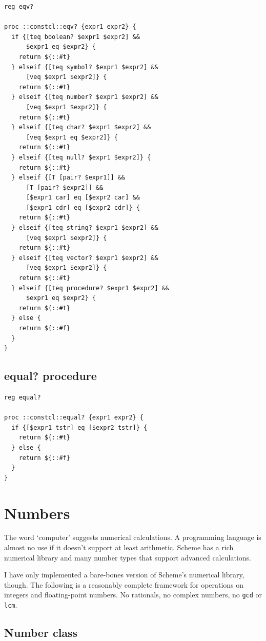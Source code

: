 \documentclass[a5paper,draft]{memoir}
\begin{document}
\begin{lstlisting}
reg eqv?

proc ::constcl::eqv? {expr1 expr2} {
  if {[teq boolean? $expr1 $expr2] &&
      $expr1 eq $expr2} {
    return ${::#t}
  } elseif {[teq symbol? $expr1 $expr2] &&
      [veq $expr1 $expr2]} {
    return ${::#t}
  } elseif {[teq number? $expr1 $expr2] &&
      [veq $expr1 $expr2]} {
    return ${::#t}
  } elseif {[teq char? $expr1 $expr2] &&
      [veq $expr1 eq $expr2]} {
    return ${::#t}
  } elseif {[teq null? $expr1 $expr2]} {
    return ${::#t}
  } elseif {[T [pair? $expr1]] &&
      [T [pair? $expr2]] &&
      [$expr1 car] eq [$expr2 car] &&
      [$expr1 cdr] eq [$expr2 cdr]} {
    return ${::#t}
  } elseif {[teq string? $expr1 $expr2] &&
      [veq $expr1 $expr2]} {
    return ${::#t}
  } elseif {[teq vector? $expr1 $expr2] &&
      [veq $expr1 $expr2]} {
    return ${::#t}
  } elseif {[teq procedure? $expr1 $expr2] &&
      $expr1 eq $expr2} {
    return ${::#t}
  } else {
    return ${::#f}
  }
}
\end{lstlisting}

\subsection{equal? procedure}
\label{equal-procedure}

\begin{lstlisting}
reg equal?

proc ::constcl::equal? {expr1 expr2} {
  if {[$expr1 tstr] eq [$expr2 tstr]} {
    return ${::#t}
  } else {
    return ${::#f}
  }
}
\end{lstlisting}

\section{Numbers}
\label{numbers}

The word `computer' suggests numerical calculations. A programming language is almost no use if it doesn't support at least arithmetic. Scheme has a rich numerical library and many number types that support advanced calculations.

I have only implemented a bare-bones version of Scheme's numerical library, though. The following is a reasonably complete framework for operations on integers and floating-point numbers. No rationals, no complex numbers, no \texttt{gcd} or \texttt{lcm}.

\subsection{Number class}
\label{number-class}
\end{document}
